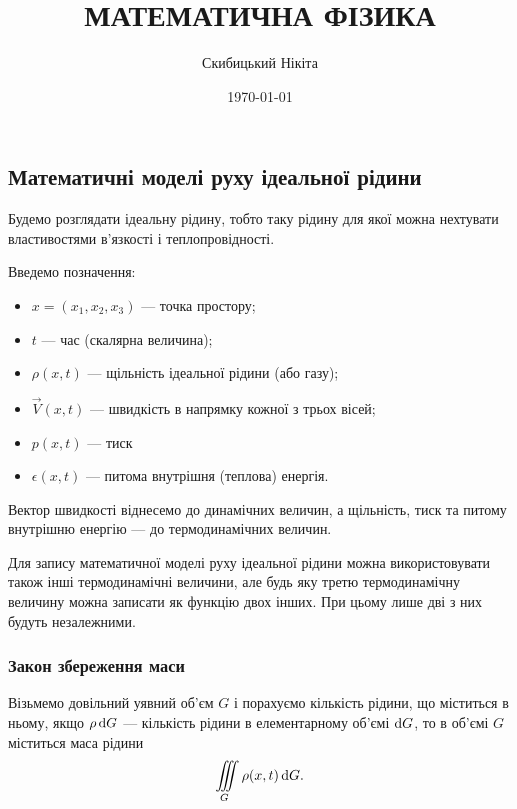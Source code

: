 

\title{{\Huge МАТЕМАТИЧНА ФІЗИКА}}
\author{Скибицький Нікіта}
\date{\today}





\tableofcontents

\setcounter{section}{3}
\setcounter{subsection}{2}
\setcounter{subsubsection}{10}
\setcounter{theorem}{40}
\setcounter{equation}{111}

\subsection{Математичні моделі руху ідеальної рідини}

Будемо розглядати ідеальну рідину, тобто таку рідину для якої можна нехтувати властивостями в'язкості і теплопровідності. \medskip

Введемо позначення:
\begin{itemize}
	\item $x = (x_1, x_2, x_3)$ --- точка простору;
	\item $t$ --- час (скалярна величина);
	\item $\rho(x, t)$ --- щільність ідеальної рідини (або газу);
	\item $\vec V(x, t)$ --- швидкість в напрямку кожної з трьох вісей;
	\item $p(x, t)$ --- тиск 
	\item $\epsilon(x, t)$ --- питома внутрішня (теплова) енергія.
\end{itemize}

Вектор швидкості віднесемо до динамічних величин, а щільність, тиск та питому внутрішню енергію --- до термодинамічних величин. \medskip

Для запису математичної моделі руху ідеальної рідини можна використовувати також інші термодинамічні величини, але будь яку третю термодинамічну величину можна записати як функцію двох інших. При цьому лише дві з них будуть незалежними. 

\subsubsection{Закон збереження маси}

Візьмемо довільний уявний об'єм $G$ і порахуємо кількість рідини, що міститься в ньому, якщо $\rho \mathop{}\!\mathrm{d} G$ --- кількість рідини в елементарному об'ємі $\mathop{}\!\mathrm{d} G$, то в об'ємі $G$ міститься маса рідини
\begin{equation}
	\displaystyle\iiint\limits_G \rho(x, t) \mathop{}\!\mathrm{d} G.
\end{equation}

